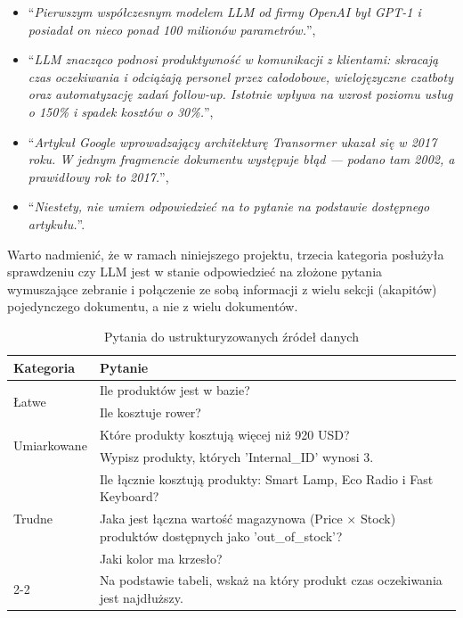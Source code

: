     \begin{itemize}
        \item \enquote{\textit{Pierwszym współczesnym modelem LLM od firmy OpenAI był GPT-1 i posiadał on nieco ponad 100 milionów parametrów.}},
        
        \item \enquote{\textit{LLM znacząco podnosi produktywność w komunikacji z klientami: skracają czas oczekiwania i odciążają personel przez całodobowe, wielojęzyczne czatboty oraz automatyzację zadań follow‑up.  Istotnie wpływa na wzrost poziomu usług o 150\% i spadek kosztów o 30\%.}},
        
        \item \enquote{\textit{Artykuł Google wprowadzający architekturę Transormer ukazał się w 2017 roku. W jednym fragmencie dokumentu występuje błąd — podano tam 2002, a prawidłowy rok to 2017.}},
        
        \item \enquote{\textit{Niestety, nie umiem odpowiedzieć na to pytanie na podstawie dostępnego artykułu.}}.
    \end{itemize}

    \noindent Warto nadmienić, że w ramach niniejszego projektu, trzecia kategoria posłużyła sprawdzeniu czy LLM jest w stanie odpowiedzieć na złożone pytania wymuszające zebranie i połączenie ze sobą informacji z wielu sekcji (akapitów) pojedynczego dokumentu, a nie z wielu dokumentów. 

    \begin{table}[h]
        \centering
        \caption{ Pytania do ustrukturyzowanych źródeł danych }        
        \begin{tabularx}{\textwidth}{|l|X|}
        \hline
        \textbf{Kategoria} & \textbf{Pytanie} \\ \hline
        
        \multirow{2}{*}{Łatwe} & Ile produktów jest w bazie? \\ \cline{2-2} 
         & Ile kosztuje rower? \\ \hline
        
        \multirow{2}{*}{Umiarkowane} & Które produkty kosztują więcej niż 920 USD? \\ \cline{2-2} 
         & Wypisz produkty, których 'Internal\_ID' wynosi 3. \\ \hline
        
        \multirow{3}{*}{Trudne} & Ile łącznie kosztują produkty: Smart Lamp, Eco Radio i Fast Keyboard? \\ \cline{2-2} 
         & Jaka jest łączna wartość magazynowa (Price × Stock) produktów dostępnych jako 'out\_of\_stock'? \\ \hline

         \multirow{3}{*}{Odmowa odpowiedzi} & Jaki kolor ma krzesło? \\ \cline{2-2} 
         & Na podstawie tabeli, wskaż na który produkt czas oczekiwania jest najdłuższy. \\ \hline
        
        \end{tabularx}
        \label{pytania_ustrukturyzowane}
    \end{table}


